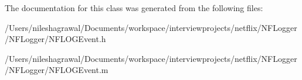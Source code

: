 The documentation for this class was generated from the following files\+:\begin{DoxyCompactItemize}
\item 
/\+Users/nileshagrawal/\+Documents/workspace/interviewprojects/netflix/\+N\+F\+Logger/\+N\+F\+Logger/N\+F\+L\+O\+G\+Event.\+h\item 
/\+Users/nileshagrawal/\+Documents/workspace/interviewprojects/netflix/\+N\+F\+Logger/\+N\+F\+Logger/N\+F\+L\+O\+G\+Event.\+m\end{DoxyCompactItemize}
